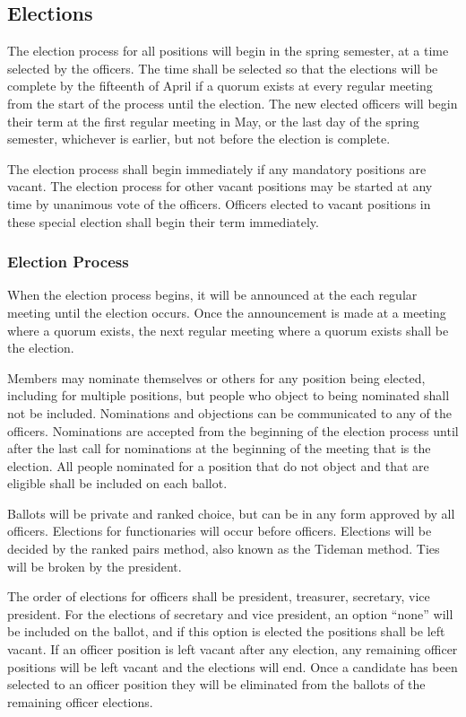 \documentclass{article}
\begin{document}
\subsection{Elections}

The election process for all positions will begin in the spring semester, at a
time selected by the officers. The time shall be selected so that the elections
will be complete by the fifteenth of April if a quorum exists at every regular
meeting from the start of the process until the election. The new elected
officers will begin their term at the first regular meeting in May, or the last
day of the spring semester, whichever is earlier, but not before the election is
complete.

The election process shall begin immediately if any mandatory positions are
vacant. The election process for other vacant positions may be started at any
time by unanimous vote of the officers. Officers elected to vacant positions in
these special election shall begin their term immediately.

\subsubsection{Election Process}

When the election process begins, it will be announced at the each regular
meeting until the election occurs. Once the announcement is made at a meeting
where a quorum exists, the next regular meeting where a quorum exists shall be
the election.

Members may nominate themselves or others for any position being elected,
including for multiple positions, but people who object to being nominated shall
not be included. Nominations and objections can be communicated to any of the
officers. Nominations are accepted from the beginning of the election process
until after the last call for nominations at the beginning of the meeting that
is the election. All people nominated for a position that do not object and that
are eligible shall be included on each ballot.

Ballots will be private and ranked choice, but can be in any form approved by
all officers. Elections for functionaries will occur before officers. Elections
will be decided by the ranked pairs method, also known as the Tideman method.
Ties will be broken by the president.

The order of elections for officers shall be president, treasurer, secretary,
vice president. For the elections of secretary and vice president, an option
``none'' will be included on the ballot, and if this option is elected the
positions shall be left vacant. If an officer position is left vacant after any
election, any remaining officer positions will be left vacant and the elections
will end. Once a candidate has been selected to an officer position they will be
eliminated from the ballots of the remaining officer elections.
\end{document}
